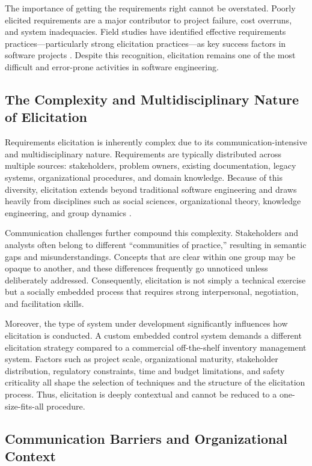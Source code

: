The importance of getting the requirements right cannot be overstated. Poorly elicited requirements are a major contributor to project failure, cost overruns, and system inadequacies. Field studies have identified effective requirements practices—particularly strong elicitation practices—as key success factors in software projects \cite{Hofmann2001}. Despite this recognition, elicitation remains one of the most difficult and error-prone activities in software engineering.

\subsection{The Complexity and Multidisciplinary Nature of Elicitation}

Requirements elicitation is inherently complex due to its communication-intensive and multidisciplinary nature. Requirements are typically distributed across multiple sources: stakeholders, problem owners, existing documentation, legacy systems, organizational procedures, and domain knowledge. Because of this diversity, elicitation extends beyond traditional software engineering and draws heavily from disciplines such as social sciences, organizational theory, knowledge engineering, and group dynamics \cite{Goguen1993}.

Communication challenges further compound this complexity. Stakeholders and analysts often belong to different “communities of practice,” resulting in semantic gaps and misunderstandings. Concepts that are clear within one group may be opaque to another, and these differences frequently go unnoticed unless deliberately addressed. Consequently, elicitation is not simply a technical exercise but a socially embedded process that requires strong interpersonal, negotiation, and facilitation skills.

Moreover, the type of system under development significantly influences how elicitation is conducted. A custom embedded control system demands a different elicitation strategy compared to a commercial off-the-shelf inventory management system. Factors such as project scale, organizational maturity, stakeholder distribution, regulatory constraints, time and budget limitations, and safety criticality all shape the selection of techniques and the structure of the elicitation process. Thus, elicitation is deeply contextual and cannot be reduced to a one-size-fits-all procedure.

\subsection{Communication Barriers and Organizational Context}

